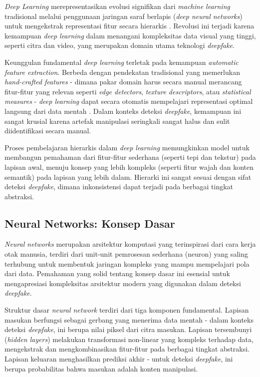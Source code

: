 \textit{Deep Learning} merepresentasikan evolusi signifikan dari \textit{machine learning} tradisional melalui penggunaan jaringan saraf berlapis (\textit{deep neural networks}) untuk mengekstrak representasi fitur secara hierarkis \cite{lecun2015deep}. Revolusi ini terjadi karena kemampuan \textit{deep learning} dalam menangani kompleksitas data visual yang tinggi, seperti citra dan video, yang merupakan domain utama teknologi \textit{deepfake}.

Keunggulan fundamental \textit{deep learning} terletak pada kemampuan \textit{automatic feature extraction}. Berbeda dengan pendekatan tradisional yang memerlukan \textit{hand-crafted features} - dimana pakar domain harus secara manual merancang fitur-fitur yang relevan seperti \textit{edge detectors}, \textit{texture descriptors}, atau \textit{statistical measures} - \textit{deep learning} dapat secara otomatis mempelajari representasi optimal langsung dari data mentah \cite{bengio2013representation}. Dalam konteks deteksi \textit{deepfake}, kemampuan ini sangat krusial karena artefak manipulasi seringkali sangat halus dan sulit diidentifikasi secara manual.

Proses pembelajaran hierarkis dalam \textit{deep learning} memungkinkan model untuk membangun pemahaman dari fitur-fitur sederhana (seperti tepi dan tekstur) pada lapisan awal, menuju konsep yang lebih kompleks (seperti fitur wajah dan konten semantik) pada lapisan yang lebih dalam. Hierarki ini sangat sesuai dengan sifat deteksi \textit{deepfake}, dimana inkonsistensi dapat terjadi pada berbagai tingkat abstraksi.

\subsection{Neural Networks: Konsep Dasar}

\textit{Neural networks} merupakan arsitektur komputasi yang terinspirasi dari cara kerja otak manusia, terdiri dari unit-unit pemrosesan sederhana (neuron) yang saling terhubung untuk membentuk jaringan kompleks yang mampu mempelajari pola dari data. Pemahaman yang solid tentang konsep dasar ini esensial untuk mengapresiasi kompleksitas arsitektur modern yang digunakan dalam deteksi \textit{deepfake}.

Struktur dasar \textit{neural network} terdiri dari tiga komponen fundamental. Lapisan masukan berfungsi sebagai gerbang yang menerima data mentah - dalam konteks deteksi \textit{deepfake}, ini berupa nilai piksel dari citra masukan. Lapisan tersembunyi (\textit{hidden layers}) melakukan transformasi non-linear yang kompleks terhadap data, mengekstrak dan mengkombinasikan fitur-fitur pada berbagai tingkat abstraksi. Lapisan keluaran menghasilkan prediksi akhir - untuk deteksi \textit{deepfake}, ini berupa probabilitas bahwa masukan adalah konten manipulasi.

